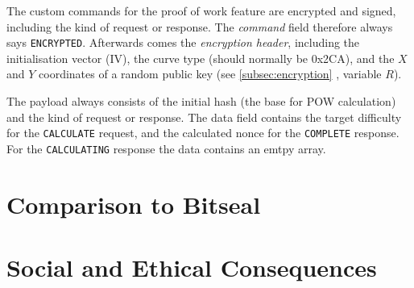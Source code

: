 \documentclass{bfh}
\begin{document}
  The custom commands for the proof of work feature are encrypted and signed, including the kind of request or response. The \textit{command} field therefore always says \texttt{ENCRYPTED}. Afterwards comes the \textit{encryption header}, including the initialisation vector (IV), the curve type (should normally be 0x2CA), and the $X$ and $Y$ coordinates of a random public key (see \ref{subsec:encryption} , variable $R$).

  The payload always consists of the initial hash (the base for \ac{POW} calculation) and the kind of request or response. The data field contains the target difficulty for the \texttt{CALCULATE} request, and the calculated nonce for the \texttt{COMPLETE} response. For the \texttt{CALCULATING} response the data contains an emtpy array.

  \section{Comparison to Bitseal}


  \section{Social and Ethical Consequences}
  

  \newpage
  
  
\end{document}
